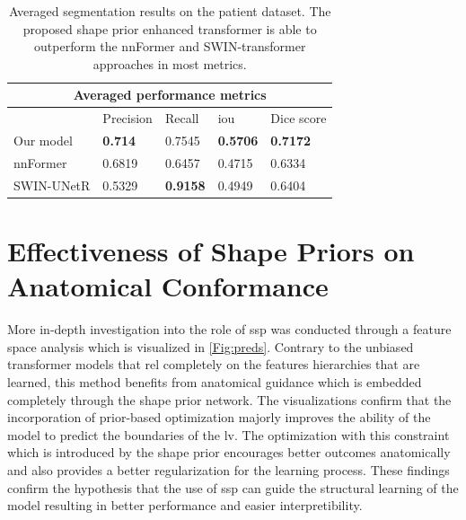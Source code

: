 \begin{table}[h!t]
\begin{tabular}{ |p{2.3cm}|p{2.3cm}|p{2.3cm}|p{2.3cm}|p{2.3cm}|}
\hline
\multicolumn{5}{|c|}{Averaged performance metrics} \\
\hline
& Precision & Recall & \gls{iou} & Dice score \\
\hline
Our model & \textbf{0.714} & 0.7545 & \textbf{0.5706} & \textbf{0.7172} \\
\hline
nnFormer & 0.6819 & 0.6457 & 0.4715 & 0.6334 \\
\hline
SWIN-UNetR & 0.5329 & \textbf{0.9158} & 0.4949 & 0.6404 \\
\hline
\end{tabular}
\caption{Averaged segmentation results on the patient dataset. The proposed shape prior enhanced transformer is able to outperform the nnFormer \cite{zhou2023nnformer} and SWIN-transformer \cite{10.1007/978-3-031-08999-2_22} approaches in most metrics.}
\label{tab:quantitative_comparison}
\end{table}

\section{Effectiveness of Shape Priors on Anatomical Conformance}
More in-depth investigation into the role of \gls{ssp} was conducted through a feature space analysis which is visualized in \cref{Fig:preds}. Contrary to the unbiased transformer models that rel completely on the features hierarchies that are learned, this method benefits from anatomical guidance which is embedded completely through the shape prior network. The visualizations confirm that the incorporation of prior-based optimization majorly improves the ability of the model to predict the boundaries of the \gls{lv}. The optimization with this constraint which is introduced by the shape prior encourages better outcomes anatomically and also provides a better regularization for the learning process. These findings confirm the hypothesis that the use of \gls{ssp} can guide the structural learning of the model resulting in better performance and easier interpretibility.

